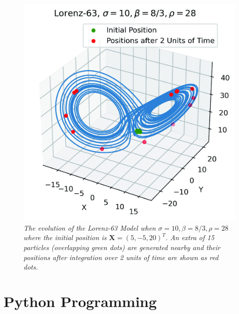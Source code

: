 \begin{figure}[ht!]
    \centering
    \includegraphics[scale=0.8]{graphics/Lorenz63_28.jpg}
    \caption{\textit{The evolution of the Lorenz-63 Model when $\sigma=10, \beta=8/3, \rho=28$ where the initial position is $\textbf{X} = (5,-5,20)^T$. An extra of 15 particles (overlapping green dots) are generated nearby and their positions after integration over 2 units of time are shown as red dots.}}
    \label{fig:lor63r28}
\end{figure}

\section{Python Programming}

